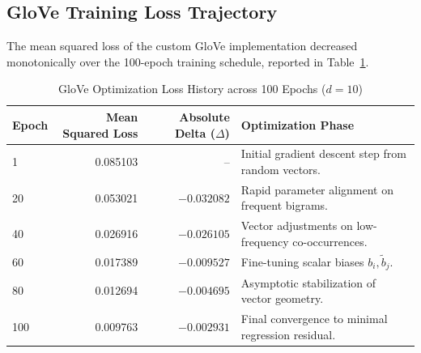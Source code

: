 \documentclass[12pt,a4paper]{report}
\begin{document}
\subsection{GloVe Training Loss Trajectory}
The mean squared loss of the custom GloVe implementation decreased monotonically over the 100-epoch training schedule, reported in Table~\ref{tab:exp6_loss_history}.
\begin{table}[H]
\centering
\small
\caption{GloVe Optimization Loss History across 100 Epochs ($d=10$)}
\label{tab:exp6_loss_history}
\begin{tabular}{lrrp{6.5cm}}
\toprule
\textbf{Epoch} & \textbf{Mean Squared Loss} & \textbf{Absolute Delta ($\Delta$)} & \textbf{Optimization Phase} \\
\midrule
1 & 0.085103 & -- & Initial gradient descent step from random vectors. \\
20 & 0.053021 & $-0.032082$ & Rapid parameter alignment on frequent bigrams. \\
40 & 0.026916 & $-0.026105$ & Vector adjustments on low-frequency co-occurrences. \\
60 & 0.017389 & $-0.009527$ & Fine-tuning scalar biases $b_i, \tilde{b}_j$. \\
80 & 0.012694 & $-0.004695$ & Asymptotic stabilization of vector geometry. \\
100 & 0.009763 & $-0.002931$ & Final convergence to minimal regression residual. \\
\bottomrule
\end{tabular}
\end{table}
\end{document}
